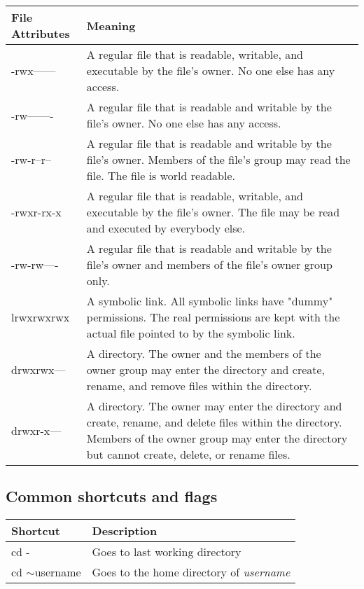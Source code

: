 \documentclass[12pt]{article}
\begin{document}
\vskip 0.08in
\noindent \begin{tabular}{|l|p{5in}|}
	\hline
	File Attributes & Meaning\\ \hline
	-rwx------ & A regular file that is readable, writable, and executable by the file's owner. No one else has any access.\\
	-rw------- & A regular file that is readable and writable by the file's owner. No one else has any access.\\
	-rw-r--r-- & A regular file that is readable and writable by the file's owner. Members of the file's group may read the file. The file is world readable.\\
	-rwxr-rx-x & A regular file that is readable, writable, and executable by the file's owner. The file may be read and executed by everybody else.\\
	-rw-rw---- & A regular file that is readable and writable by the file's owner and members of the file's owner group only.\\
	lrwxrwxrwx & A symbolic link. All symbolic links have "dummy" permissions. The real permissions are kept with the actual file pointed to by the symbolic link.\\
	drwxrwx--- & A directory. The owner and the members of the owner group may enter the directory and create, rename, and remove files within the directory.\\
	drwxr-x--- & A directory. The owner may enter the directory and create, rename, and delete files within the directory. Members of the owner group may enter the directory but cannot create, delete, or rename files.\\
	\hline

\end{tabular}


\newpage
\subsection{Common shortcuts and flags}%

\noindent\begin{tabular}{| l | l |}
	\hline
	Shortcut & Description\\ \hline
	cd - & Goes to last working directory\\
	cd $\mathtt{\sim}$username & Goes to the home directory of \textit{username}\\
	\hline
\end{tabular}
\end{document}
